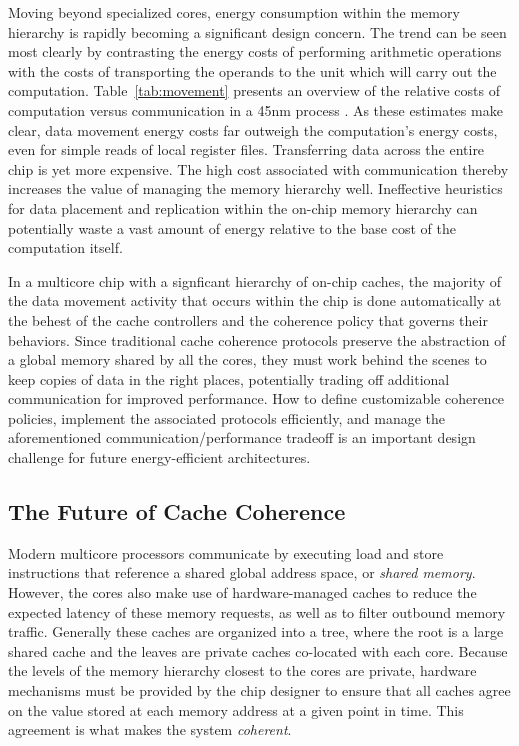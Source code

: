Moving beyond specialized cores, energy consumption within the memory hierarchy is rapidly becoming a significant design concern.
The trend can be seen most clearly by contrasting the energy costs of performing arithmetic operations with the costs of transporting the operands to the unit which will carry out the computation.
Table~\ref{tab:movement} presents an overview of the relative costs of computation versus communication in a 45nm process \cite{dally-hpca02}.
As these estimates make clear, data movement energy costs far outweigh the computation's energy costs, even for simple reads of local register files.
Transferring data across the entire chip is yet more expensive.
The high cost associated with communication thereby increases the value of managing the memory hierarchy well.
Ineffective heuristics for data placement and replication within the on-chip memory hierarchy can potentially waste a vast amount of energy relative to the base cost of the computation itself.

In a multicore chip with a signficant hierarchy of on-chip caches, the majority of the data movement activity that occurs within the chip is done automatically at the behest of the cache controllers and the coherence policy that governs their behaviors.
Since traditional cache coherence protocols preserve the abstraction of a global memory shared by all the cores,
they must work behind the scenes to keep copies of data in the right places,
potentially trading off additional communication for improved performance.
How to define customizable coherence policies, implement the associated protocols efficiently,
and manage the aforementioned communication/performance tradeoff is an important design challenge for future energy-efficient architectures. 

\subsection{The Future of Cache Coherence}

Modern multicore processors communicate by executing load and store instructions that reference a shared global address space, or {\em shared memory}.
However, the cores also make use of hardware-managed caches to reduce the expected latency of these memory requests, as well as to filter outbound memory traffic.
Generally these caches are organized into a tree, where the root is a large shared cache and the leaves are private caches co-located with each core.
Because the levels of the memory hierarchy closest to the cores are private, hardware mechanisms must be provided by the chip designer to ensure that all caches agree on the value stored at each memory address at a given point in time.
This agreement is what makes the system {\em coherent}.

